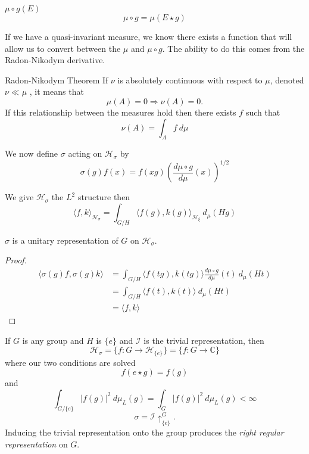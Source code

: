 \documentclass{article}
\begin{document}
\begin{Define}{$\mu \circ g (E)$}
    \[%
        \mu \circ g = \mu(E \star g) 
    \]%
\end{Define}

If we have a quasi-invariant measure, we know there exists a function that will allow us to convert between the $\mu$ and $\mu \circ g$. The ability to do this comes from the Radon-Nikodym derivative. 

\begin{Theorem}{Radon-Nikodym Theorem}
    If $\nu$  is absolutely continuous with respect to $\mu$, denoted $\nu \ll \mu$ , it means that 
    \[%
        \mu(A) = 0 \Rightarrow \nu(A) = 0 .
    \]%
    If this relationship between the measures hold then there exists $f$  such that
    \[%
        \nu(A) = \int_{A} f \ d\mu 
    \]%
\end{Theorem}
    
\begin{define}
    We now define  $\sigma$  acting on $\mathcal{H}_{\sigma}$  by 
    \[%
        \sigma(g)f(x) = f(xg) \left(\frac{d \mu \circ g}{d \mu}(x)\right)^{1/2}
    \]%
\end{define}

\begin{define}
We give $\mathcal{H}_{\sigma}$  the $L^{2}$  structure then 
\[
    \langle f,k \rangle_{\mathcal{H}_{\sigma}} = \int_{G/H} \langle f(g), k(g) \rangle_{\mathcal{H}_{\xi}} \ d_\mu(Hg) 
\]
\end{define}

\begin{theorem}
    $\sigma$ is a unitary representation of $G$ on $\mathcal{H}_{\sigma}$.
\end{theorem}

\begin{proof}
    \[%
        \begin{split}
            \langle \sigma (g) f, \sigma(g) k \rangle 
            &= \int_{G/H} \langle f(tg), k(tg) \rangle \frac{d \mu \circ g}{d \mu}(t) \ d_{\mu}(Ht) \\
            &= \int_{G/H} \langle f(t), k(t) \rangle \ d_{\mu}(Ht) \\
            &= \langle f,k \rangle
        \end{split} 
    \]%
\end{proof}

\begin{example}
    If $G$ is any group and $H$ is $\{ e \}$ and $\mathcal{I}$ is the trivial representation, then
    \[ 
        \mathcal{H}_{\sigma} = \{ f: G \rightarrow \mathcal{H}_{\{ e \}} \} = \{ f: G \rightarrow \mathbb{C} \} 
    \] 
    where our two conditions are solved
    \[ 
        f(e \star g ) = f(g) 
    \]
    and
    \[ 
        \int_{G/\{ e \}} | f(g) |^{2} \ d\mu_{L}(g) = \int_{G} | f(g) |^{2} \ d\mu_{L}(g) < \infty 
    \]
    \[ \sigma = \mathcal{I}\uparrow^{G}_{\{ e \}} .\]
    Inducing the trivial representation onto the group produces the \textit{right regular representation} on $G$.
\end{example}
\end{document}
